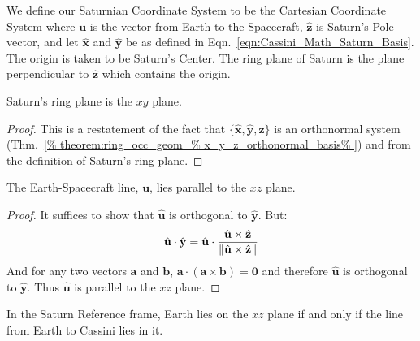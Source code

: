         We define our Saturnian Coordinate System to be the
        Cartesian Coordinate System where $\mathbf{u}$
        is the vector from Earth to the Spacecraft,
        $\hat{\mathbf{z}}$ is Saturn's Pole vector, and let
        $\hat{\mathbf{x}}$ and $\hat{\mathbf{y}}$
        be as defined in
        Eqn.~\ref{eqn:Cassini_Math_Saturn_Basis}.
        The origin is taken to be Saturn's Center.
        The ring plane of Saturn is the plane perpendicular
        to $\hat{\mathbf{z}}$ which contains the origin.
        \begin{theorem}
            Saturn's ring plane is the $xy$ plane.
        \end{theorem}
        \begin{proof}
            This is a restatement of the fact that
            $\{\hat{\mathbf{x}},%
               \hat{\mathbf{y}},%
               \hat{\mathbf{z}}\}$
            is an orthonormal system
            (Thm.~\ref{%
                theorem:ring_occ_geom_%
                x_y_z_orthonormal_basis%
            })
            and from the definition of Saturn's ring plane.
        \end{proof}
        \begin{theorem}
            \label{thm:Cassini_Math_u_parallel_xy}
            The Earth-Spacecraft line, $\mathbf{u}$,
            lies parallel to the $xz$ plane.
        \end{theorem}
        \begin{proof}
            It suffices to show that $\hat{\mathbf{u}}$
            is orthogonal to $\hat{\mathbf{y}}$.
            But:
            \begin{equation}
                \hat{\mathbf{u}}\cdot\hat{\mathbf{y}}
                =\hat{\mathbf{u}}\cdot
                \frac{\hat{\mathbf{u}}\times \hat{\mathbf{z}}}
                     {\lVert\hat{\mathbf{u}}
                      \times \hat{\mathbf{z}}\rVert}
            \end{equation}
            And for any two vectors
            $\mathbf{a}$ and $\mathbf{b}$,
            $\mathbf{a}\cdot(\mathbf{a}\times\mathbf{b})%
             =\mathbf{0}$
            and therefore $\hat{\mathbf{u}}$ is orthogonal
            to $\hat{\mathbf{y}}$. Thus
            $\hat{\mathbf{u}}$ is parallel to the $xz$ plane.
        \end{proof}
        \begin{theorem}
            \label{thm:Cassini_Math_Earth_Line_Parallel_xz}
            In the Saturn Reference frame,
            Earth lies on the $xz$ plane if and
            only if the line from
            Earth to Cassini lies in it.
        \end{theorem}
